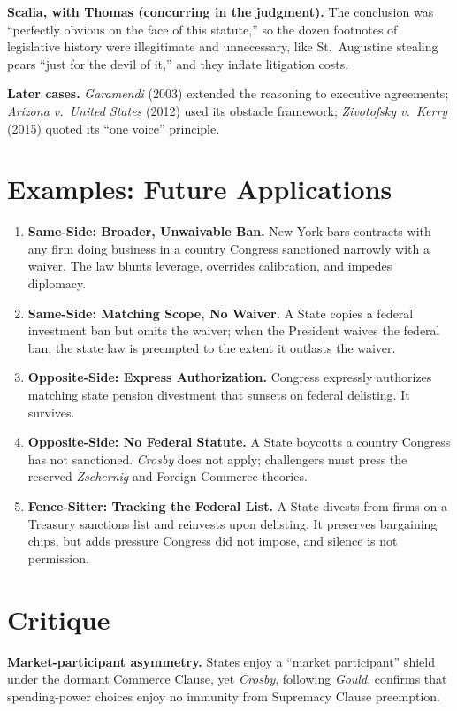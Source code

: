 \documentclass[12pt]{article}
\begin{document}
\textbf{Scalia, with Thomas (concurring in the judgment).} The conclusion was ``perfectly obvious on the face of this statute,'' so the dozen footnotes of legislative history were illegitimate and unnecessary, like St.\ Augustine stealing pears ``just for the devil of it,'' and they inflate litigation costs.

\textbf{Later cases.} \textit{Garamendi} (2003) extended the reasoning to executive agreements; \textit{Arizona v.\ United States} (2012) used its obstacle framework; \textit{Zivotofsky v.\ Kerry} (2015) quoted its ``one voice'' principle.

\section{Examples: Future Applications}

\begin{enumerate}
\item \textbf{Same-Side: Broader, Unwaivable Ban.} New York bars contracts with any firm doing business in a country Congress sanctioned narrowly with a waiver. The law blunts leverage, overrides calibration, and impedes diplomacy.
\item \textbf{Same-Side: Matching Scope, No Waiver.} A State copies a federal investment ban but omits the waiver; when the President waives the federal ban, the state law is preempted to the extent it outlasts the waiver.
\item \textbf{Opposite-Side: Express Authorization.} Congress expressly authorizes matching state pension divestment that sunsets on federal delisting. It survives.
\item \textbf{Opposite-Side: No Federal Statute.} A State boycotts a country Congress has not sanctioned. \textit{Crosby} does not apply; challengers must press the reserved \textit{Zschernig} and Foreign Commerce theories.
\item \textbf{Fence-Sitter: Tracking the Federal List.} A State divests from firms on a Treasury sanctions list and reinvests upon delisting. It preserves bargaining chips, but adds pressure Congress did not impose, and silence is not permission.
\end{enumerate}

\section{Critique}

\textbf{Market-participant asymmetry.} States enjoy a ``market participant'' shield under the dormant Commerce Clause, yet \textit{Crosby}, following \textit{Gould}, confirms that spending-power choices enjoy no immunity from Supremacy Clause preemption.
\end{document}
